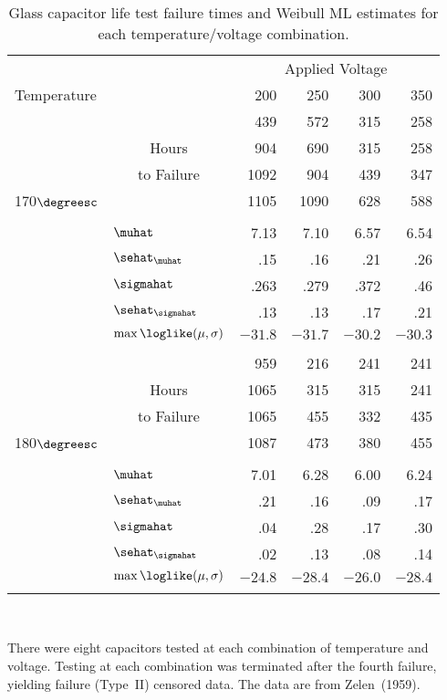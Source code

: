 \begin{table}
\caption{Glass capacitor life test failure times
and Weibull ML estimates for each temperature/voltage combination.}
\centering\small
\begin{tabular}{l  l  rrrr  } 
\\[-.5ex]
\hline
&& \multicolumn{4}{c}{Applied Voltage}\\
\cline{3-6}
Temperature && 200 & 250 & 300 & 350 \\
\hline 
               && 439& 572& 315& 258 \\
        &\multicolumn{1}{c}{Hours} & 904& 690& 315& 258 \\
               &\multicolumn{1}{c}{to Failure} &1092& 904& 439& 347 \\
170$\degreesc$ &&1105&1090& 628& 588 \\
\cline{2-6}
\\[-1.8ex]
      &$\muhat$                   &7.13    &7.10    &6.57    &6.54  \\
      &$\sehat_{\muhat}$          &.15     &.16     &.21     & .26 \\
      &$\sigmahat$                &.263    &.279    &.372    & .46 \\
      &$\sehat_{\sigmahat}$       &.13     &.13     &.17     & .21 \\
      &$\max\loglike(\mu,\sigma)$ &$-31.8$ &$-31.7$ &$-30.2$ &$-30.3$  \\
\hline
\hline
\\[-1.8ex]
               && 959& 216& 241& 241 \\
                &\multicolumn{1}{c}{Hours} & 1065&315 & 315 & 241 \\
               &\multicolumn{1}{c}{to Failure} & 1065& 455& 332& 435 \\
180$\degreesc$ && 1087 & 473& 380& 455 \\
\cline{2-6}
\\[-1.8ex]
      &$\muhat$                   &7.01    &6.28     &6.00    &6.24  \\
      &$\sehat_{\muhat}$          &.21     &.16      &.09     & .17 \\
      &$\sigmahat$                &.04     &.28      &.17     & .30 \\
      &$\sehat_{\sigmahat}$       &.02     &.13      &.08     & .14 \\
      &$\max\loglike(\mu,\sigma)$ &$-24.8$ &$-28.4$  &$-26.0$ &$-28.4$  \\
\hline
\hline
\\[-1.8ex]
\end{tabular}\\
\begin{minipage}[t]{4in}
There were eight capacitors tested at each combination of temperature
and voltage. Testing at each combination was terminated after the
fourth failure, yielding failure (Type~II) censored data. The data
are from Zelen~(1959).
\end{minipage}
\label{table:zelen.cap.data}
\end{table}
